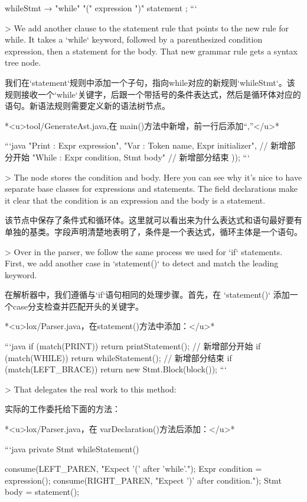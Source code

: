 \documentclass[cn,11pt,chinese]{elegantbook}
\begin{document}
{{{{whileStmt      → "while" "(" expression ")" statement ;
```

> We add another clause to the statement rule that points to the new rule for while. It takes a `while` keyword, followed by a parenthesized condition expression, then a statement for the body. That new grammar rule gets a syntax tree node.

我们在`statement`规则中添加一个子句，指向while对应的新规则`whileStmt`。该规则接收一个`while`关键字，后跟一个带括号的条件表达式，然后是循环体对应的语句。新语法规则需要定义新的语法树节点。

*<u>tool/GenerateAst.java,在 main()方法中新增，前一行后添加“,”</u>* 

```java
      "Print      : Expr expression",
      "Var        : Token name, Expr initializer",
      // 新增部分开始
      "While      : Expr condition, Stmt body"
      // 新增部分结束
    ));
```

> The node stores the condition and body. Here you can see why it’s nice to have separate base classes for expressions and statements. The field declarations make it clear that the condition is an expression and the body is a statement.

该节点中保存了条件式和循环体。这里就可以看出来为什么表达式和语句最好要有单独的基类。字段声明清楚地表明了，条件是一个表达式，循环主体是一个语句。

> Over in the parser, we follow the same process we used for `if` statements. First, we add another case in `statement()` to detect and match the leading keyword.

在解析器中，我们遵循与`if`语句相同的处理步骤。首先，在 `statement()` 添加一个case分支检查并匹配开头的关键字。

*<u>lox/Parser.java，在statement()方法中添加：</u>*

```java
    if (match(PRINT)) return printStatement();
    // 新增部分开始
    if (match(WHILE)) return whileStatement();
    // 新增部分结束
    if (match(LEFT_BRACE)) return new Stmt.Block(block());
```

> That delegates the real work to this method:

实际的工作委托给下面的方法：

*<u>lox/Parser.java，在 varDeclaration()方法后添加：</u>*

```java
  private Stmt whileStatement() {
    consume(LEFT_PAREN, "Expect '(' after 'while'.");
    Expr condition = expression();
    consume(RIGHT_PAREN, "Expect ')' after condition.");
    Stmt body = statement();

}}}}}
\end{document}
